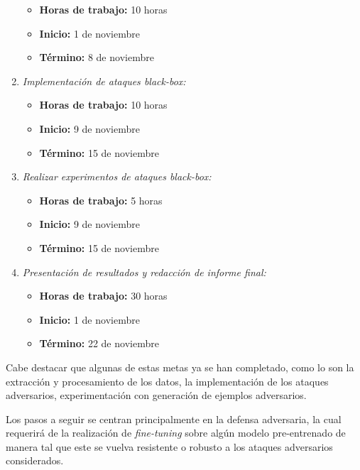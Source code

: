 \documentclass[conference]{IEEEtran}
\begin{document}
\begin{enumerate}
        \begin{itemize}
        \item \textbf{Horas de trabajo:} 10 horas
        \item \textbf{Inicio:} 1 de noviembre
        \item \textbf{Término:} 8 de noviembre
    \end{itemize}
    \item \textit{Implementación de ataques \textit{black-box}:}
        \begin{itemize}
        \item \textbf{Horas de trabajo:} 10 horas
        \item \textbf{Inicio:} 9 de noviembre
        \item \textbf{Término:} 15 de noviembre
    \end{itemize}
    \item \textit{Realizar experimentos de ataques \textit{black-box}:}
           \begin{itemize}
        \item \textbf{Horas de trabajo:} 5 horas
        \item \textbf{Inicio:} 9 de noviembre
        \item \textbf{Término:} 15 de noviembre
    \end{itemize}
    \item \textit{Presentación de resultados y redacción de informe final:}
        \begin{itemize}
        \item \textbf{Horas de trabajo:} 30 horas
        \item \textbf{Inicio:} 1 de noviembre
        \item \textbf{Término:} 22 de noviembre
    \end{itemize}
\end{enumerate}

Cabe destacar que algunas de estas metas ya se han completado, como lo son la extracción y procesamiento de los datos, la implementación de los ataques adversarios, experimentación con generación de ejemplos adversarios.

Los pasos a seguir se centran principalmente en la defensa adversaria, la cual requerirá de la realización de \textit{fine-tuning} sobre algún modelo pre-entrenado de manera tal que este se vuelva resistente o robusto a los ataques adversarios considerados.
\end{document}
